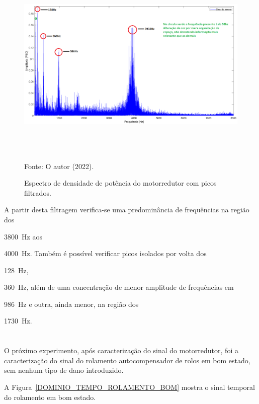 \documentclass[
	12pt,				
	oneside,			
	a4paper,			
	english,			
	brazil,			
	]{abntex2ppgsi}
\begin{document}
{{{{{{{\begin{figure}[H]
\centering
\caption {Espectro de densidade de potência do motorredutor com picos filtrados.}
\includegraphics[width=\textwidth,height=100mm,keepaspectratio]{GraficosAnalise/PSD_MOTORREDUTOR_FILTRADO_ANOTADO} \\
Fonte: O autor (2022).
\label{PSD_MOTORREDUTOR_FILTRADO_ANOTADO}
\end{figure}

A partir desta filtragem verifica-se uma predominância de frequências na região dos {\SI{3800}{\hertz} aos {\SI{4000}{\hertz}. Também é possível verificar picos isolados por volta dos {\SI{128}{\hertz}, {\SI{360}{\hertz}, além de uma concentração de menor amplitude de frequências em {\SI{986}{\hertz} e outra, ainda menor, na região dos {\SI{1730}{\hertz}. 


\section{}

O próximo experimento, após caracterização do sinal do motorredutor, foi a caracterização do sinal do rolamento autocompensador de rolos em bom estado, sem nenhum tipo de dano introduzido. 

A Figura~\ref{DOMINIO_TEMPO_ROLAMENTO_BOM} mostra o sinal temporal do rolamento em bom estado. 

}}}}}}}}}}}}}
\end{document}
